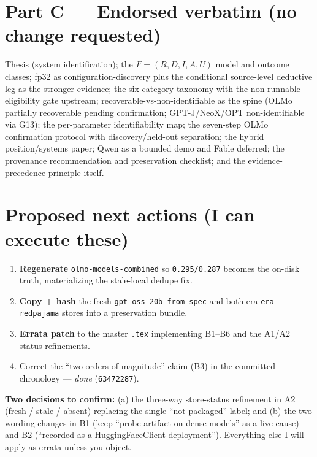 \documentclass[11pt]{article}
\newcommand{\code}[1]{\texttt{#1}}
\begin{document}
\section*{Part C --- Endorsed verbatim (no change requested)}

Thesis (system identification); the $F=(R,D,I,A,U)$ model and outcome classes; fp32 as
configuration-discovery plus the conditional source-level deductive leg as the stronger
evidence; the six-category taxonomy with the non-runnable eligibility gate upstream;
recoverable-vs-non-identifiable as the spine (OLMo partially recoverable pending
confirmation; GPT-J/NeoX/OPT non-identifiable via G13); the per-parameter identifiability
map; the seven-step OLMo confirmation protocol with discovery/held-out separation; the
hybrid position/systems paper; Qwen as a bounded demo and Fable deferred; the provenance
recommendation and preservation checklist; and the evidence-precedence principle itself.

\section*{Proposed next actions (I can execute these)}

\begin{enumerate}[nosep]
  \item \textbf{Regenerate} \code{olmo-models-combined} so \code{0.295/0.287} becomes the
        on-disk truth, materializing the stale-local dedupe fix.
  \item \textbf{Copy + hash} the fresh \code{gpt-oss-20b-from-spec} and both-era
        \code{era-redpajama} stores into a preservation bundle.
  \item \textbf{Errata patch} to the master \code{.tex} implementing B1--B6 and the
        A1/A2 status refinements.
  \item Correct the ``two orders of magnitude'' claim (B3) in the committed chronology
        --- \emph{done} (\code{63472287}).
\end{enumerate}

\textbf{Two decisions to confirm:} (a) the three-way store-status refinement in A2
(fresh / stale / absent) replacing the single ``not packaged'' label; and (b) the two
wording changes in B1 (keep ``probe artifact on dense models'' as a live cause) and B2
(``recorded as a HuggingFaceClient deployment''). Everything else I will apply as errata
unless you object.
\end{document}
